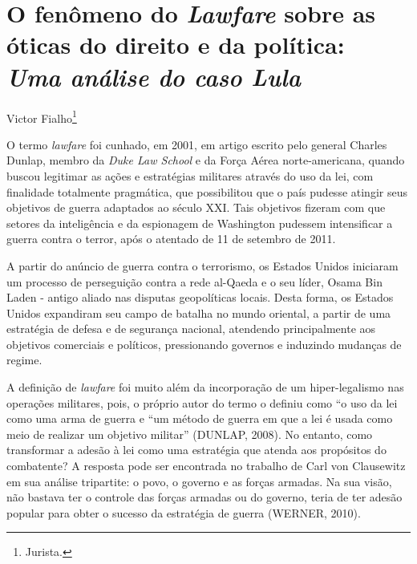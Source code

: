 \chapter*{O fenômeno do \emph{Lawfare} sobre as óticas do direito e da política:\\
\emph{Uma análise do caso Lula}}

\begin{flushright}
Victor Fialho\footnote{Jurista.}
\end{flushright}

O termo \emph{lawfare} foi cunhado, em 2001, em artigo escrito pelo
general Charles Dunlap, membro da \emph{Duke Law School} e da Força
Aérea norte-americana, quando buscou legitimar as ações e estratégias
militares através do uso da lei, com finalidade totalmente pragmática,
que possibilitou que o país pudesse atingir seus objetivos de guerra
adaptados ao século XXI. Tais objetivos fizeram com que setores da
inteligência e da espionagem de Washington pudessem intensificar a
guerra contra o terror, após o atentado de 11 de setembro de 2011.

A partir do anúncio de guerra contra o terrorismo, os Estados Unidos
iniciaram um processo de perseguição contra a rede al-Qaeda e o seu
líder, Osama Bin Laden - antigo aliado nas disputas geopolíticas locais.
Desta forma, os Estados Unidos expandiram seu campo de batalha no mundo
oriental, a partir de uma estratégia de defesa e de segurança nacional,
atendendo principalmente aos objetivos comerciais e políticos,
pressionando governos e induzindo mudanças de regime.

A definição de \emph{lawfare} foi muito além da incorporação de um
hiper-legalismo nas operações militares, pois, o próprio autor do termo
o definiu como ``o uso da lei como uma arma de guerra e ``um método de
guerra em que a lei é usada como meio de realizar um objetivo militar''
(DUNLAP, 2008). No entanto, como transformar a adesão à lei como uma
estratégia que atenda aos propósitos do combatente? A resposta pode ser
encontrada no trabalho de Carl von Clausewitz em sua análise tripartite:
o povo, o governo e as forças armadas. Na sua visão, não bastava ter o
controle das forças armadas ou do governo, teria de ter adesão popular
para obter o sucesso da estratégia de guerra (WERNER, 2010).

